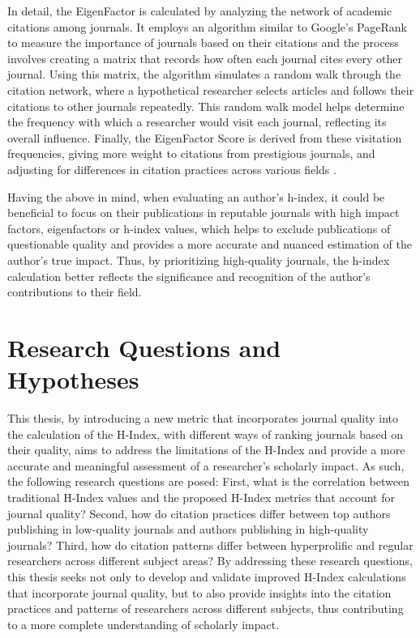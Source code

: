 In detail, the EigenFactor is calculated by analyzing the network of academic
citations among journals. It employs an algorithm similar to Google's PageRank
to measure the importance of journals based on their citations and the process
involves creating a matrix that records how often each journal cites every
other journal. Using this matrix, the algorithm simulates a random walk through
the citation network, where a hypothetical researcher selects articles and
follows their citations to other journals repeatedly. This random walk model
helps determine the frequency with which a researcher would visit each journal,
reflecting its overall influence. Finally, the EigenFactor Score is derived
from these visitation frequencies, giving more weight to citations from
prestigious journals, and adjusting for differences in citation practices
across various fields \cite{Bergstrom11433, Alan2009}.

Having the above in mind, when evaluating an author's h-index, it could be
beneficial to focus on their publications in reputable journals with high
impact factors, eigenfactors or h-index values, which helps to exclude
publications of questionable quality and provides a more accurate and nuanced
estimation of the author's true impact. Thus, by prioritizing high-quality
journals, the h-index calculation better reflects the significance and
recognition of the author's contributions to their field.

\section{Research Questions and Hypotheses}
This thesis, by introducing a new metric that incorporates journal quality into
the calculation of the H-Index, with different ways of ranking journals based
on their quality, aims to address the limitations of the H-Index and provide a
more accurate and meaningful assessment of a researcher's scholarly impact. As
such, the following research questions are posed: First, what is the
correlation between traditional H-Index values and the proposed H-Index metrics
that account for journal quality? Second, how do citation practices differ
between top authors publishing in low-quality journals and authors publishing
in high-quality journals? Third, how do citation patterns differ between
hyperprolific and regular researchers across different subject
areas? By addressing these research questions, this thesis seeks not only to
develop and validate improved H-Index calculations that incorporate journal
quality, but to also provide insights into the citation practices and patterns
of researchers across different subjects, thus contributing to a more complete
understanding of scholarly impact.
